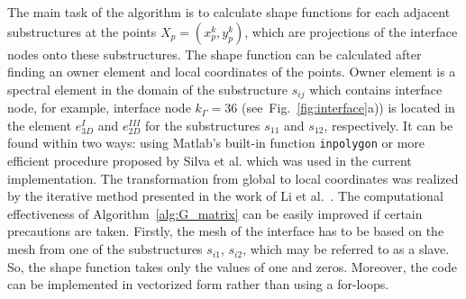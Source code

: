 The main task of the algorithm is to calculate shape functions for each adjacent substructures at the points \(X_p=(x_p^k,y_p^k)\), which are projections of the interface nodes onto these substructures.
The shape function can be calculated after finding an owner element and local coordinates of the points.
Owner element is a spectral element in the domain of the substructure \(s_{ij}\) which contains interface node, for example, interface node \(k_\Gamma=36\) (see~Fig.~\ref{fig:interface}a)) is located in the element \(e^{I}_{3D}\) and \(e^{III}_{2D}\) for the substructures \(s_{11}\) and \(s_{12}\), respectively.
It can be found within two ways: using Matlab's built-in function \verb+inpolygon+ or more efficient procedure proposed by Silva et al. \cite{silva2009exact} which was used in the current implementation.
The transformation from global to local coordinates was realized by the iterative method presented in the work of Li et al.~\cite{li2014efficient}.
The computational effectiveness of Algorithm~\ref{alg:G_matrix} can be easily improved if certain precautions are taken.
Firstly, the mesh of the interface has to be based on the mesh from one of the substructures \(s_{i1}\), \(s_{i2}\), which may be referred to as a slave.
So, the shape function takes only the values of one and zeros.
Moreover, the code can be implemented in vectorized form rather than using a for-loops.